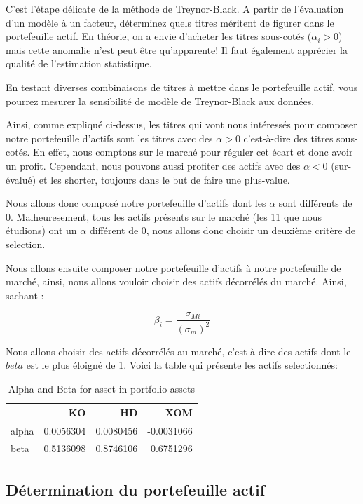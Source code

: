 \documentclass[
]{article}
\begin{document}
C'est l'étape délicate de la méthode de Treynor-Black. A partir de
l'évaluation d'un modèle à un facteur, déterminez quels titres méritent
de figurer dans le portefeuille actif. En théorie, on a envie d'acheter
les titres sous-cotés (\(\alpha_i > 0\)) mais cette anomalie n'est peut
être qu'apparente! Il faut également apprécier la qualité de
l'estimation statistique.

En testant diverses combinaisons de titres à mettre dans le portefeuille
actif, vous pourrez mesurer la sensibilité de modèle de Treynor-Black
aux données.

Ainsi, comme expliqué ci-dessus, les titres qui vont nous intéressés
pour composer notre portefeuille d'actifs sont les titres avec des
\(\alpha > 0\) c'est-à-dire des titres sous-cotés. En effet, nous
comptons sur le marché pour réguler cet écart et donc avoir un profit.
Cependant, nous pouvons aussi profiter des actifs avec des
\(\alpha < 0\) (sur-évalué) et les shorter, toujours dans le but de
faire une plus-value.

Nous allons donc composé notre portefeuille d'actifs dont les \(\alpha\)
sont différents de 0. Malheuresement, tous les actifs présents sur le
marché (les 11 que nous étudions) ont un \(\alpha\) différent de 0, nous
allons donc choisir un deuxième critère de selection.

Nous allons ensuite composer notre portefeuille d'actifs à notre
portefeuille de marché, ainsi, nous allons vouloir choisir des actifs
décorrélés du marché. Ainsi, sachant :

\[
\beta_i = \frac{\sigma_{Mi}}{(\sigma_m)^2}
\]

Nous allons choisir des actifs décorrélés au marché, c'est-à-dire des
actifs dont le \(beta\) est le plus éloigné de 1. Voici la table qui
présente les actifs selectionnés:

\begin{table}[H]

\caption{\label{tab:unnamed-chunk-9}Alpha and Beta for asset in portfolio assets}
\centering
\begin{tabular}[t]{lrrr}
\toprule
  & KO & HD & XOM\\
\midrule
alpha & 0.0056304 & 0.0080456 & -0.0031066\\
beta & 0.5136098 & 0.8746106 & 0.6751296\\
\bottomrule
\end{tabular}
\end{table}

\hypertarget{duxe9termination-du-portefeuille-actif}{%
\subsection{Détermination du portefeuille
actif}\label{duxe9termination-du-portefeuille-actif}}
\end{document}
